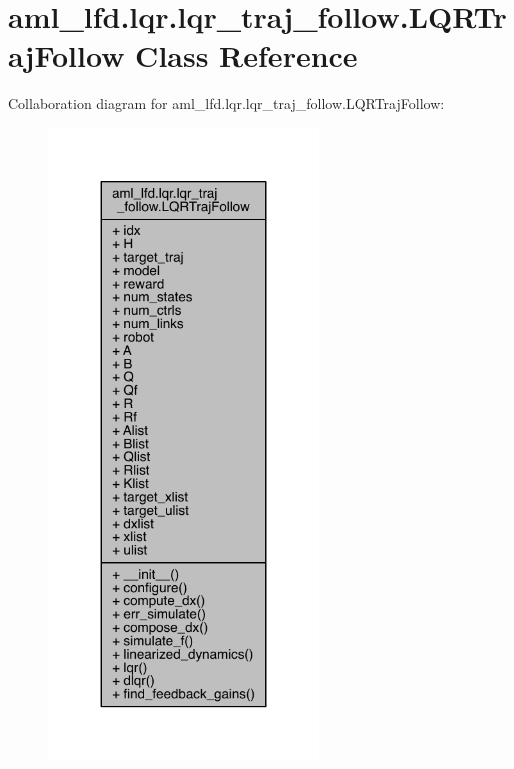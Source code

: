 \hypertarget{classaml__lfd_1_1lqr_1_1lqr__traj__follow_1_1_l_q_r_traj_follow}{}\section{aml\+\_\+lfd.\+lqr.\+lqr\+\_\+traj\+\_\+follow.\+L\+Q\+R\+Traj\+Follow Class Reference}
\label{classaml__lfd_1_1lqr_1_1lqr__traj__follow_1_1_l_q_r_traj_follow}


Collaboration diagram for aml\+\_\+lfd.\+lqr.\+lqr\+\_\+traj\+\_\+follow.\+L\+Q\+R\+Traj\+Follow\+:\nopagebreak
\begin{figure}[H]
\begin{center}
\leavevmode
\includegraphics[width=203pt]{classaml__lfd_1_1lqr_1_1lqr__traj__follow_1_1_l_q_r_traj_follow__coll__graph}
\end{center}
\end{figure}
